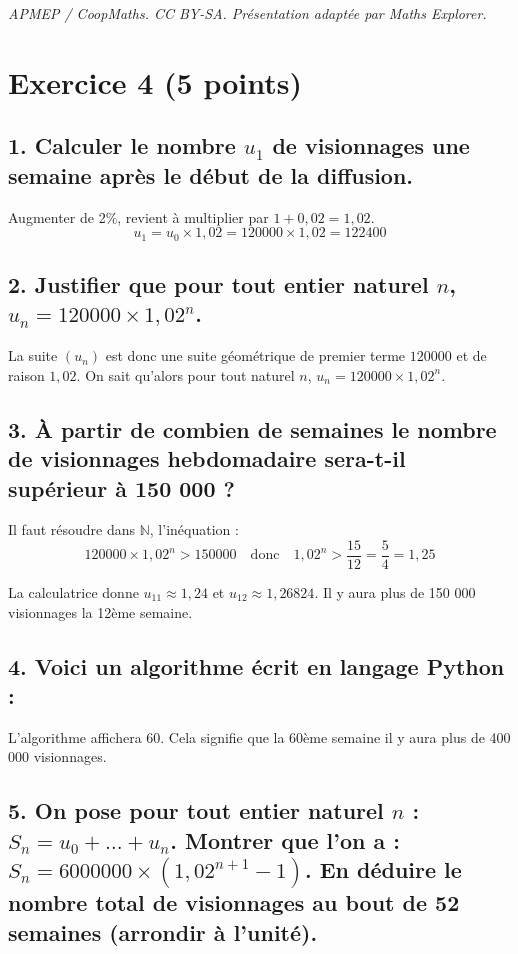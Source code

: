 \documentclass[10pt]{article}
\begin{document}
\noindent\textit{APMEP / CoopMaths. CC BY-SA. Présentation adaptée par Maths Explorer.}\par\medskip
\section*{Exercice 4 (5 points)}
	
\subsection*{1. Calculer le nombre $u_1$ de visionnages une semaine après le début de la diffusion.}
	
Augmenter de 2\%, revient à multiplier par $1 + 0,02 = 1,02$.
	\[
	u_1 = u_0 \times 1,02 = 120000 \times 1,02 = 122400
	\]
	
	\subsection*{2. Justifier que pour tout entier naturel $n$, $u_n = 120000 \times 1,02^n$.}
	
La suite $(u_n)$ est donc une suite géométrique de premier terme $120 000$ et de raison $1,02$. On sait qu’alors pour tout naturel $n$, $u_n = 120000 \times 1,02^n$.
	
	\subsection*{3. À partir de combien de semaines le nombre de visionnages hebdomadaire sera-t-il supérieur à 150 000 ?}
	
	Il faut résoudre dans $\mathbb{N}$, l’inéquation :
	\[
	120000 \times 1,02^n > 150000 \quad \text{donc} \quad 1,02^n > \dfrac{15}{12} = \dfrac{5}{4} = 1,25
	\]
	
	La calculatrice donne $u_{11} \approx 1,24$ et $u_{12} \approx 1,26824$. Il y aura plus de 150 000 visionnages la 12ème semaine.
	
\subsection*{4. Voici un algorithme écrit en langage Python :}
L’algorithme affichera 60. Cela signifie que la 60ème semaine il y aura plus de 400 000 visionnages.
	
	\subsection*{5. On pose pour tout entier naturel $n$ : $S_n = u_0 + \ldots + u_n$. Montrer que l’on a : $S_n = 6000000 \times (1,02^{n+1} - 1)$. En déduire le nombre total de visionnages au bout de 52 semaines (arrondir à l’unité).}
	
\end{document}
